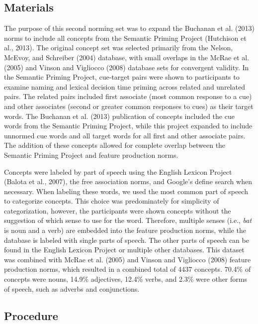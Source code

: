 \documentclass[english,man]{apa6}
\theoremstyle{definition}
\theoremstyle{definition}
\theoremstyle{definition}
\theoremstyle{remark}
\begin{document}
\subsection{Materials}\label{materials}

The purpose of this second norming set was to expand the Buchanan et al.
(2013) norms to include all concepts from the Semantic Priming Project
(Hutchison et al., 2013). The original concept set was selected
primarily from the Nelson, McEvoy, and Schreiber (2004) database, with
small overlaps in the McRae et al. (2005) and Vinson and Vigliocco
(2008) database sets for convergent validity. In the Semantic Priming
Project, cue-target pairs were shown to participants to examine naming
and lexical decision time priming across related and unrelated pairs.
The related pairs included first associate (most common response to a
cue) and other associates (second or greater common responses to cues)
as their target words. The Buchanan et al. (2013) publication of
concepts included the cue words from the Semantic Priming Project, while
this project expanded to include unnormed cue words and all target words
for all first and other associate pairs. The addition of these concepts
allowed for complete overlap between the Semantic Priming Project and
feature production norms.

Concepts were labeled by part of speech using the English Lexicon
Project (Balota et al., 2007), the free association norms, and Google's
define search when necessary. When labeling these words, we used the
most common part of speech to categorize concepts. This choice was
predominately for simplicity of categorization, however, the
participants were shown concepts without the suggestion of which sense
to use for the word. Therefore, multiple senses (i.e., \emph{bat} is
noun and a verb) are embedded into the feature production norms, while
the database is labeled with single parts of speech. The other parts of
speech can be found in the English Lexicon Project or multiple other
databases. This dataset was combined with McRae et al. (2005) and Vinson
and Vigliocco (2008) feature production norms, which resulted in a
combined total of 4437 concepts. 70.4\% of concepts were nouns, 14.9\%
adjectives, 12.4\% verbs, and 2.3\% were other forms of speech, such as
adverbs and conjunctions.

\subsection{Procedure}\label{procedure}
\end{document}
